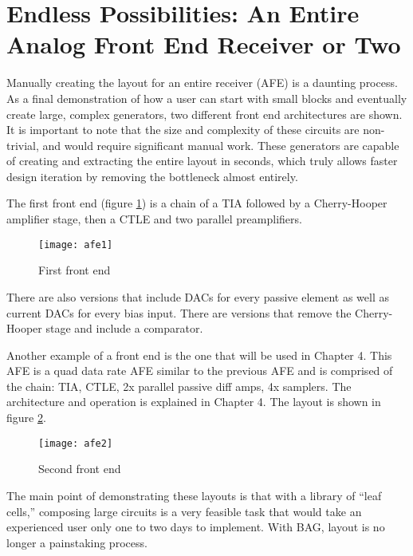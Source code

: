 \section{Endless Possibilities: An Entire Analog Front End Receiver or Two}
Manually creating the layout for an entire receiver (AFE) is a daunting process. As a final demonstration of how a user can start with small blocks and eventually create large, complex generators, two different front end architectures are shown. It is important to note that the size and complexity of these circuits are non-trivial, and would require significant manual work. These generators are capable of creating and extracting the entire layout in seconds, which truly allows faster design iteration by removing the bottleneck almost entirely. 

The first front end (figure \ref{fig:afe1}) is a chain of a TIA followed by a Cherry-Hooper amplifier stage, then a CTLE and two parallel preamplifiers. 
\begin{figure}[h]
\centering
\texttt{[image: afe1]}
\caption{First front end}
\label{fig:afe1}
\end{figure}
There are also versions that include DACs for every passive element as well as current DACs for every bias input. There are versions that remove the Cherry-Hooper stage and include a comparator. 

Another example of a front end is the one that will be used in Chapter 4. This AFE is a quad data rate AFE similar to the previous AFE and is comprised of the chain: TIA, CTLE, 2x parallel passive diff amps, 4x samplers. The architecture and operation is explained in Chapter 4. The layout is shown in figure \ref{fig:afe2}.
\begin{figure}[h]
\centering
\texttt{[image: afe2]}
\caption{Second front end}
\label{fig:afe2}
\end{figure}
The main point of demonstrating these layouts is that with a library of ``leaf cells,'' composing large circuits is a very feasible task that would take an experienced user only one to two days to implement. With BAG, layout is no longer a painstaking process.

